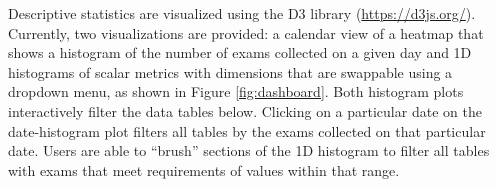 Descriptive statistics are visualized using the D3 library (\href{https://d3js.org/}{https://d3js.org/}). Currently, two visualizations are provided: a calendar view of a heatmap that shows a histogram of the number of exams collected on a given day and 1D histograms of scalar metrics with dimensions that are swappable using a dropdown menu, as shown in Figure \ref{fig:dashboard}. Both histogram plots interactively filter the data tables below. Clicking on a particular date on the date-histogram plot filters all tables by the exams collected on that particular date. Users are able to ``brush'' sections of the 1D histogram to filter all tables with exams that meet requirements of values within that range.  